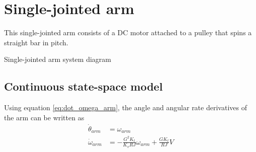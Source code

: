 \section{Single-jointed arm}
\label{sec:ss_model_single-jointed_arm}

This single-jointed arm consists of a DC motor attached to a pulley that spins a
straight bar in pitch.
\begin{bookfigure}
  
  \caption{Single-jointed arm system diagram}
\end{bookfigure}

\subsection{Continuous state-space model}

Using equation \eqref{eq:dot_omega_arm}, the angle and angular rate derivatives
of the arm can be written as
\begin{align}
  \dot{\theta}_{arm} &= \omega_{arm} \\
  \dot{\omega}_{arm} &= -\frac{G^2 K_t}{K_v RJ} \omega_{arm} + \frac{G K_t}{RJ} V
\end{align}

